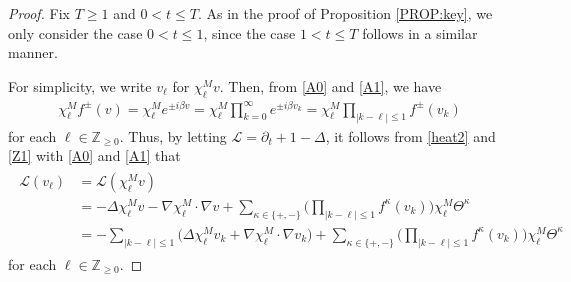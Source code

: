\documentclass[letterpaper, 11pt,  reqno]{amsart}
\theoremstyle{myremark}
\newcommand{\Ta}{\Theta}
\newcommand{\1}{\hspace{0.5mm}\text{I}\hspace{0.5mm}}
\newcommand{\Z}{\mathbb{Z}}
\renewcommand{\L}{\mathcal{L}}
\newcommand{\be}{\beta}
\newcommand{\nb}{\nabla}
\newcommand{\Dl}{\Delta}
\newcommand{\kk}{\kappa}
\newcommand{\dt}{\partial_t}
\renewcommand{\l}{\ell}
\numberwithin{equation}{section}
\numberwithin{theorem}{section}
\begin{document}
\begin{proof}
Fix $T\ge 1$ and $0 < t \le T$. 
As in the proof of Proposition \ref{PROP:key}, 
we only consider the case  $0 < t \le 1$, 
since the case $1 < t \le T$ follows in a similar manner.



For simplicity, 
we write $v_\l$ for $\chi^M_\l v$. 
Then, from \eqref{A0} and \eqref{A1}, we have 
\begin{align}
\chi^M_\l f^\pm(v) = \chi^M_\l e^{\pm i \be v} 
= \chi^M _\l \prod_{k = 0}^\infty e^{\pm i \be v_k}  = 
\chi^M_\l
\prod_{ |k - \l| \le 1}
f^\pm(v_k)
\label{Z1}
\end{align}
for each $\l \in \Z_{\ge 0}$.
Thus, by 
letting $\L = \dt + 1 -\Dl $, it follows from \eqref{heat2} and \eqref{Z1}
with \eqref{A0} and \eqref{A1}
 that 
\begin{align}
\begin{split}
\L (v_\l) & = \L(\chi^M_\l v) \\
& = - \Dl \chi_\l^M v -  \nb \chi^M_\l \cdot \nb v + \sum_{\kk \in \{+, -\}} 
\bigg(\prod_{ |k - \l| \le 1} f^\kk(v_k) \bigg)\chi^M_\l   \Ta^\kk\\
& = - \sum_{ |k - \l| \le 1}\big(\Dl \chi_\l^M v_k +   \nb \chi^M_\l \cdot \nb v_k\big)
+ \sum_{\kk \in \{+, -\}} 
\bigg(\prod_{ |k - \l| \le 1} f^\kk(v_k) \bigg)\chi^M_\l   \Ta^\kk
\end{split}
\label{Z2}
\end{align}
for each $\l \in \Z_{\ge 0}$.




\end{proof}
\end{document}
